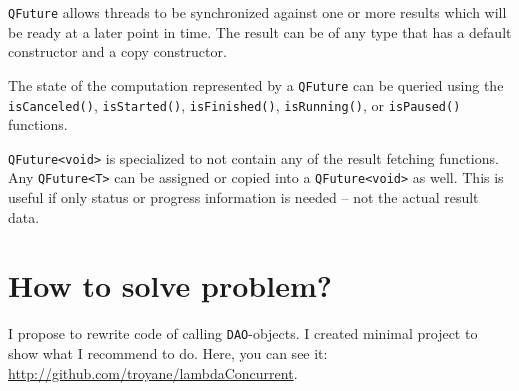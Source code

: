 \documentclass[a4paper,12pt]{scrartcl}
\begin{document}
\texttt{QFuture} allows threads to be synchronized against one or more results which will be ready at a later point 
in time. The result can be of any type that has a default constructor and a copy constructor. 

The state of the computation represented by a \texttt{QFuture} can be queried using the \texttt{isCanceled()}, 
\texttt{isStarted()}, \texttt{isFinished()}, \texttt{isRunning()}, or \texttt{isPaused()} functions.

\texttt{QFuture<void>} is specialized to not contain any of the result fetching functions. Any \texttt{QFuture<T>} 
can be assigned or copied into a \texttt{QFuture<void>} as well. This is useful if only status or progress information 
is needed -- not the actual result data.

\section{How to solve problem?}
I propose to rewrite code of calling \texttt{DAO}-objects. I created minimal project to show what I recommend to do. 
Here, you can see it: \url{http://github.com/troyane/lambdaConcurrent}.
\end{document}
